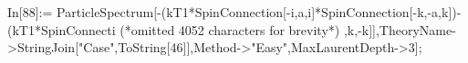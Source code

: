 In[88]:= ParticleSpectrum[-(kT1*SpinConnection[-i,a,i]*SpinConnection[-k,-a,k])-(kT1*SpinConnecti (*omitted 4052 characters for brevity*) ,k,-k]],TheoryName->StringJoin["Case",ToString[46]],Method->"Easy",MaxLaurentDepth->3];